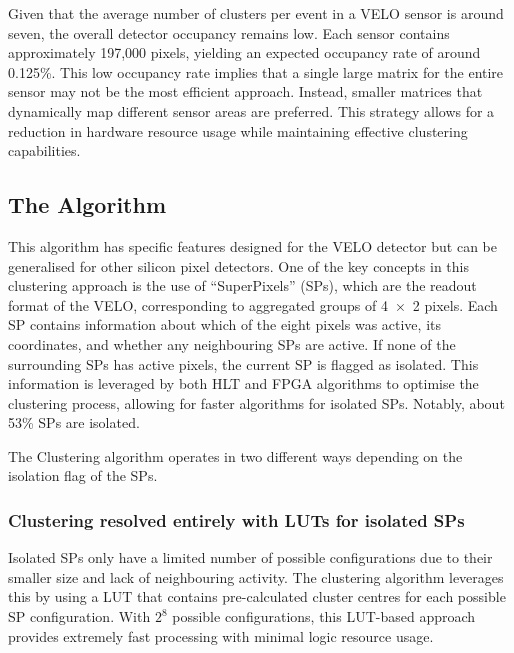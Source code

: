 Given that the average number of clusters per event in a VELO sensor is around seven, the overall detector occupancy remains low. Each sensor contains approximately 197,000 pixels, yielding an expected occupancy rate of around 0.125\%\cite{Bediaga:2013tje}. This low occupancy rate implies that a single large matrix for the entire sensor may not be the most efficient approach. Instead, smaller matrices that dynamically map different sensor areas are preferred. This strategy allows for a reduction in hardware resource usage while maintaining effective clustering capabilities. 

\subsection*{The Algorithm}
This algorithm has specific features designed for the VELO detector but can be generalised for other silicon pixel detectors. One of the key concepts in this clustering approach is the use of ``SuperPixels'' (SPs), which are the readout format of the VELO, corresponding to aggregated groups of 4~×~2 pixels. Each SP contains information about which of the eight pixels was active, its coordinates, and whether any neighbouring SPs are active. If none of the surrounding SPs has active pixels, the current SP is flagged as isolated. This information is leveraged by both HLT and FPGA algorithms to optimise the clustering process, allowing for faster algorithms for isolated SPs. Notably, about 53\% SPs are isolated.

The Clustering algorithm operates in two different ways depending on the isolation flag of the SPs.
\subsubsection{Clustering resolved entirely with LUTs for isolated SPs}
Isolated SPs only have a limited number of possible configurations due to their smaller size and lack of neighbouring activity. The clustering algorithm leverages this by using a LUT that contains pre-calculated cluster centres for each possible SP configuration. With $2^8$ possible configurations, this LUT-based approach provides extremely fast processing with minimal logic resource usage.

